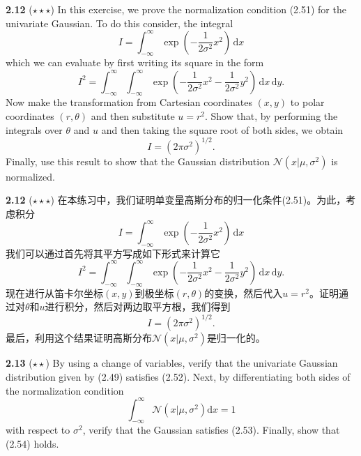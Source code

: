 \documentclass{article}
\begin{document}
\textbf{2.12} ($\star\star\star$) In this exercise, we prove the normalization condition (2.51) for the univariate Gaussian. To do this consider, the integral
\begin{equation}
I = \int_{-\infty}^{\infty} \exp \left( -\frac{1}{2\sigma^2}x^2 \right) \,\mathrm{d}x \tag{2.124}
\end{equation}
which we can evaluate by first writing its square in the form
\begin{equation}
I^2 = \int_{-\infty}^{\infty} \int_{-\infty}^{\infty} \exp \left( -\frac{1}{2\sigma^2}x^2 - \frac{1}{2\sigma^2}y^2 \right) \,\mathrm{d}x \,\mathrm{d}y. \tag{2.125}
\end{equation}
Now make the transformation from Cartesian coordinates $(x, y)$ to polar coordinates $(r, \theta)$ and then substitute $u = r^2$. Show that, by performing the integrals over $\theta$ and $u$ and then taking the square root of both sides, we obtain
\begin{equation}
I = \left( 2\pi\sigma^2 \right)^{1/2}. \tag{2.126}
\end{equation}
Finally, use this result to show that the Gaussian distribution $\mathcal{N}(x|\mu, \sigma^2)$ is normalized.

\textbf{2.12} ($\star\star\star$) 在本练习中，我们证明单变量高斯分布的归一化条件(2.51)。为此，考虑积分
\begin{equation}
I = \int_{-\infty}^{\infty} \exp \left( -\frac{1}{2\sigma^2}x^2 \right) \,\mathrm{d}x \tag{2.124}
\end{equation}
我们可以通过首先将其平方写成如下形式来计算它
\begin{equation}
I^2 = \int_{-\infty}^{\infty} \int_{-\infty}^{\infty} \exp \left( -\frac{1}{2\sigma^2}x^2 - \frac{1}{2\sigma^2}y^2 \right) \,\mathrm{d}x \,\mathrm{d}y. \tag{2.125}
\end{equation}
现在进行从笛卡尔坐标$(x, y)$到极坐标$(r, \theta)$的变换，然后代入$u = r^2$。证明通过对$\theta$和$u$进行积分，然后对两边取平方根，我们得到
\begin{equation}
I = \left( 2\pi\sigma^2 \right)^{1/2}. \tag{2.126}
\end{equation}
最后，利用这个结果证明高斯分布$\mathcal{N}(x|\mu, \sigma^2)$是归一化的。

\textbf{2.13} ($\star\star$) By using a change of variables, verify that the univariate Gaussian distribution given by (2.49) satisfies (2.52). Next, by differentiating both sides of the normalization condition
\begin{equation}
\int_{-\infty}^{\infty} \mathcal{N}\left(x | \mu, \sigma^{2}\right) \mathrm{d} x=1
\tag{2.127}
\end{equation}
with respect to $\sigma^{2}$, verify that the Gaussian satisfies (2.53). Finally, show that (2.54) holds.
\end{document}
